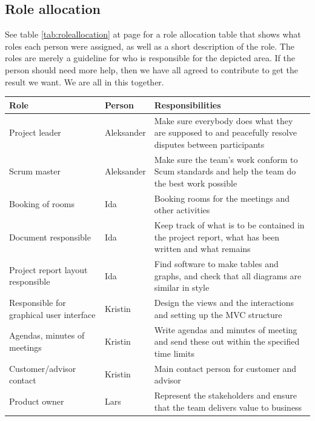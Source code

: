 \subsection{Role allocation}
See table \ref{tab:roleallocation} at page \pageref{tab:roleallocation} for a role allocation table that shows what roles each person were assigned, as well as a short description of the role. The roles are merely a guideline for who is responsible for the depicted area. If the person should need more help, then we have all agreed to contribute to get the result we want. We are all in this together.
\begin{table}[hbt]
\begin{center}
\begin{tabularx}{\linewidth}{>{\setlength\hsize{.5\hsize}}X|>{\setlength\hsize{0.3\hsize}}X|>{\setlength\hsize{1\hsize}}X} \hline
\textbf{Role} & \textbf{Person} & \textbf{Responsibilities} \\ \hline \hline

Project leader & Aleksander & Make sure everybody does what they are supposed to and peacefully resolve disputes between participants \\  \hline
Scrum master & Aleksander & Make sure the team’s work conform to Scum standards and help the team do the best work possible \\ \hline

Booking of rooms & Ida & Booking rooms for the meetings and other activities \\ \hline
Document responsible & Ida &Keep track of what is to be contained in the project report, what has been written and what remains \\ \hline
Project report layout responsible & Ida &Find software to make tables and graphs, and check that all diagrams are similar in style \\ \hline

Responsible for graphical user interface & Kristin & Design the views and the interactions and setting up the MVC structure \\ \hline
Agendas, minutes of meetings & Kristin &Write agendas and minutes of meeting and send these out within the specified time limits \\ \hline
Customer/advisor contact & Kristin & Main contact person for customer and advisor \\ \hline

Product owner & Lars & Represent the stakeholders and ensure that the team delivers value to business\\ \hline


\end{tabularx}
\end{center}
\end{table}
